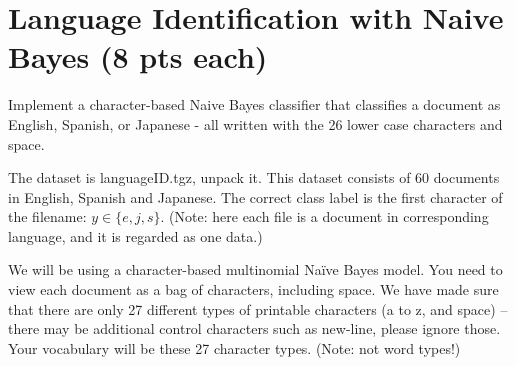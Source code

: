\documentclass[a4paper]{article}
\theoremstyle{definition}
\begin{document}
\section{Language Identification with Naive Bayes (8 pts each)}
Implement a character-based Naive Bayes classifier that classifies a document as English, Spanish, or Japanese - all written with the 26 lower case characters and space.

The dataset is languageID.tgz, unpack it.
This dataset consists of 60 documents in English, Spanish and Japanese. 
The correct class label is the first character of the filename: $y \in \{e, j, s\}$. (Note: here each file is a document in corresponding language, and it is regarded as one data.)

We will be using a character-based multinomial Naïve Bayes model.  You need to view each document as a bag of characters, including space.  We have made sure that there are only 27 different types of printable characters (a to z, and space) -- there may be additional control characters such as new-line, please ignore those.  Your vocabulary will be these 27 character types. (Note: not word types!)
\end{document}

